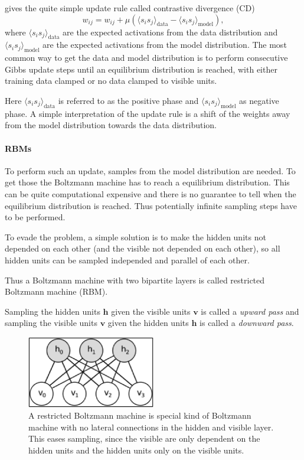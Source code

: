 gives the quite simple update rule called contrastive divergence (CD)
\[
w_{ij}= w_{ij} + \mu ( \langle s_i s_j \rangle_{\text{data}} - \langle s_i s_j \rangle_{\text{model}} ) ,
\]
where $\langle s_i s_j \rangle_{\text{data}}$ are the expected activations from the data distribution and  $ \langle s_i s_j \rangle_{\text{model}}$ are the expected activations from the model distribution.
The most common way to get the data and model distribution is to perform consecutive Gibbs update steps until an equilibrium distribution is reached, with either training data clamped or no data clamped to visible units.

Here $\langle s_i s_j \rangle_{\text{data}}$ is referred to as the positive phase and $ \langle s_i s_j \rangle_{\text{model}}$ as negative phase.
A simple interpretation of the update rule is a shift of the weights away from the model distribution towards the data distribution.

\paragraph{RBMs}

To perform such an update, samples from the model distribution are needed. 
To get those the Boltzmann  machine has to reach a equilibrium distribution. 
This can be quite computational expensive and there is no guarantee to tell when the equilibrium distribution is reached.
Thus potentially infinite sampling steps have to be performed.

To evade the problem, a simple solution is to make the hidden units not depended on each other (and the visible not depended on each other), so all hidden units can be sampled independed and parallel of each other.

Thus a Boltzmann machine with two bipartite layers is called restricted Boltzmann machine (RBM).

Sampling the hidden units $\textbf{h}$ given the visible units $\textbf{v}$ is called a \textit{upward pass} and sampling the visible units $\textbf{v}$ given the hidden units $\textbf{h}$ is called a \textit{downward pass}.

\begin{figure}
	\centering
    	\includegraphics[width=0.5\textwidth]{imgs/rbm.png} 
    \caption{A restricted Boltzmann machine is special kind of Boltzmann machine with no lateral connections in the hidden and visible layer. This eases sampling, since the visible are only dependent on the hidden units and the hidden units only on the visible units.}
	\label{fig:rbm}
\end{figure}

